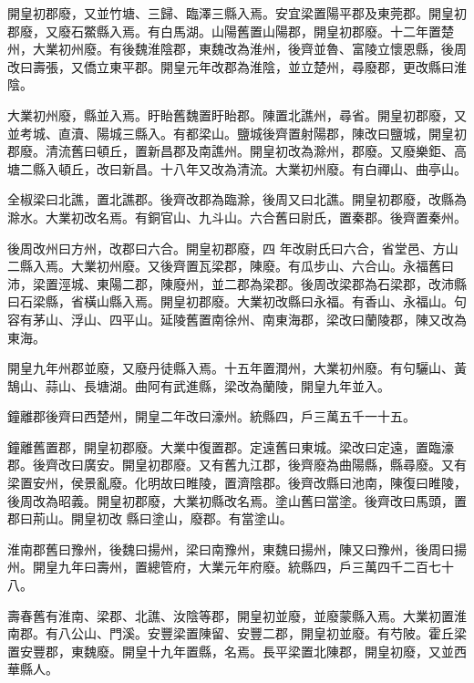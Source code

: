 \begin{pinyinscope}
 開皇初郡廢，又並竹塘、三歸、臨澤三縣入焉。安宜梁置陽平郡及東莞郡。開皇初郡廢，又廢石鱉縣入焉。有白馬湖。山陽舊置山陽郡，開皇初郡廢。十二年置楚州，大業初州廢。有後魏淮陰郡，東魏改為淮州，後齊並魯、富陵立懷恩縣，後周改曰壽張，又僑立東平郡。開皇元年改郡為淮陰，並立楚州，尋廢郡，更改縣曰淮陰。



 大業初州廢，縣並入焉。盱眙舊魏置盱眙郡。陳置北譙州，尋省。開皇初郡廢，又並考城、直瀆、陽城三縣入。有都梁山。鹽城後齊置射陽郡，陳改曰鹽城，開皇初郡廢。清流舊曰頓丘，置新昌郡及南譙州。開皇初改為滁州，郡廢。又廢樂鉅、高塘二縣入頓丘，改曰新昌。十八年又改為清流。大業初州廢。有白禪山、曲亭山。



 全椒梁曰北譙，置北譙郡。後齊改郡為臨滁，後周又曰北譙。開皇初郡廢，改縣為滁水。大業初改名焉。有銅官山、九斗山。六合舊曰尉氏，置秦郡。後齊置秦州。



 後周改州曰方州，改郡曰六合。開皇初郡廢，四
 年改尉氏曰六合，省堂邑、方山二縣入焉。大業初州廢。又後齊置瓦梁郡，陳廢。有瓜步山、六合山。永福舊曰沛，梁置涇城、東陽二郡，陳廢州，並二郡為梁郡。後周改梁郡為石梁郡，改沛縣曰石梁縣，省橫山縣入焉。開皇初郡廢。大業初改縣曰永福。有香山、永福山。句容有茅山、浮山、四平山。延陵舊置南徐州、南東海郡，梁改曰蘭陵郡，陳又改為東海。



 開皇九年州郡並廢，又廢丹徒縣入焉。十五年置潤州，大業初州廢。有句驪山、黃鵠山、蒜山、長塘湖。曲阿有武進縣，梁改為蘭陵，開皇九年並入。



 鐘離郡後齊曰西楚州，開皇二年改曰濠州。統縣四，戶三萬五千一十五。



 鐘離舊置郡，開皇初郡廢。大業中復置郡。定遠舊曰東城。梁改曰定遠，置臨濠郡。後齊改曰廣安。開皇初郡廢。又有舊九江郡，後齊廢為曲陽縣，縣尋廢。又有梁置安州，侯景亂廢。化明故曰睢陵，置濟陰郡。後齊改縣曰池南，陳復曰睢陵，後周改為昭義。開皇初郡廢，大業初縣改名焉。塗山舊曰當塗。後齊改曰馬頭，置郡曰荊山。開皇初改
 縣曰塗山，廢郡。有當塗山。



 淮南郡舊曰豫州，後魏曰揚州，梁曰南豫州，東魏曰揚州，陳又曰豫州，後周曰揚州。開皇九年曰壽州，置總管府，大業元年府廢。統縣四，戶三萬四千二百七十八。



 壽春舊有淮南、梁郡、北譙、汝陰等郡，開皇初並廢，並廢蒙縣入焉。大業初置淮南郡。有八公山、門溪。安豐梁置陳留、安豐二郡，開皇初並廢。有芍陂。霍丘梁置安豐郡，東魏廢。開皇十九年置縣，名焉。長平梁置北陳郡，開皇初廢，又並西華縣人。




\end{pinyinscope}
